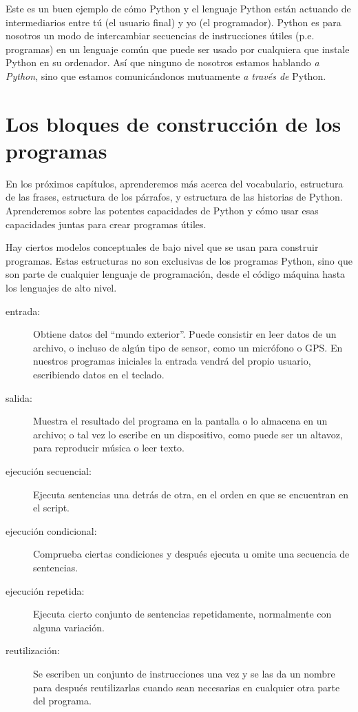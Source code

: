 Este es un buen ejemplo de cómo Python y el lenguaje Python están actuando de
intermediarios entre tú (el usuario final) y yo (el programador). Python es para nosotros
un modo de intercambiar secuencias de instrucciones útiles (p.e. programas) en un
lenguaje común que puede ser usado por cualquiera que instale
Python en su ordenador. Así que ninguno de nosotros estamos hablando {\em a Python},
sino que estamos comunicándonos mutuamente {\em a través de} Python.

\section{Los bloques de construcción de los programas}

En los próximos capítulos, aprenderemos más acerca del vocabulario, estructura de las
frases, estructura de los párrafos, y estructura de las historias de Python. Aprenderemos
sobre las potentes capacidades de Python y cómo usar esas capacidades juntas para crear
programas útiles.

Hay ciertos modelos conceptuales de bajo nivel que se usan para construir programas.
Estas estructuras no son exclusivas de los programas Python, sino que son parte de
cualquier lenguaje de programación, desde el código máquina hasta los lenguajes de alto
nivel.

\begin{description}

\item[entrada:] Obtiene datos del ``mundo exterior''. Puede consistir en
leer datos de un archivo, o incluso de algún tipo de sensor, como un micrófono
o GPS. En nuestros programas iniciales la entrada vendrá del propio usuario,
escribiendo datos en el teclado.

\item[salida:] Muestra el resultado del programa en la pantalla
o lo almacena en un archivo; o tal vez lo escribe en un dispositivo, como puede ser
un altavoz, para reproducir música o leer texto.

\item[ejecución secuencial:] Ejecuta sentencias una detrás de otra,
en el orden en que se encuentran en el script.

\item[ejecución condicional:] Comprueba ciertas condiciones y
después ejecuta u omite una secuencia de sentencias.

\item[ejecución repetida:] Ejecuta cierto conjunto de sentencias
repetidamente, normalmente con alguna variación.

\item[reutilización:] Se escriben un conjunto de instrucciones una vez y se las da un nombre
para después reutilizarlas cuando sean necesarias en cualquier otra parte
del programa.

\end{description}

